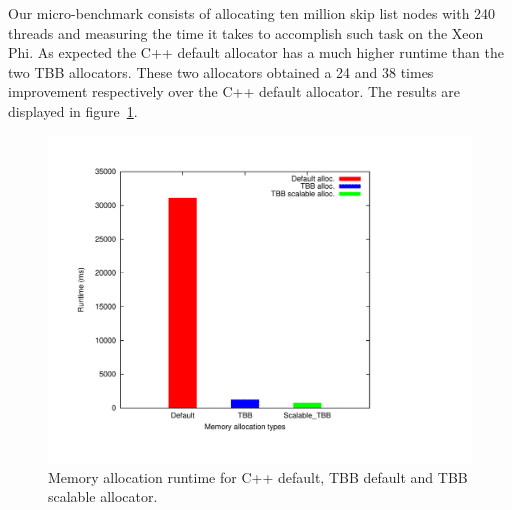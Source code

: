 Our micro-benchmark consists of allocating ten million skip list nodes with 240 threads and measuring the time it takes to accomplish such task on the Xeon Phi. As expected the C++ default allocator has a much higher runtime than the two TBB allocators. These two allocators obtained a 24 and 38 times improvement respectively over the C++ default allocator. The results are displayed in figure~\ref{fig:mem_alloc}.

\begin{figure}
	\centering
  	\includegraphics[scale=0.3]{../plots/mem_alloc/mem_alloc.pdf}
	\caption{Memory allocation runtime for C++ default, TBB default and TBB scalable allocator.}
	\label{fig:mem_alloc}
\end{figure}
